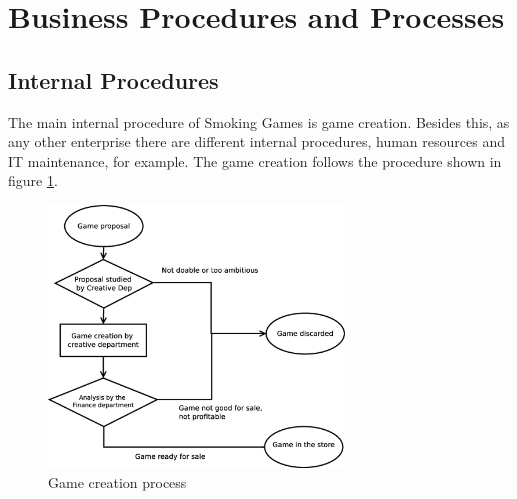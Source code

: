 \section{Business Procedures and Processes}




\subsection{Internal Procedures}
The main internal procedure of Smoking Games is game creation. Besides this, as any other enterprise there are different internal procedures, human resources and IT maintenance, for example. The game creation follows the procedure shown in figure \ref{fig:proc_game_creation}.

\begin{figure}[h] \centering
\includegraphics[width={0.7\textwidth}]{pictures/game_creation_process.eps}
\caption{Game creation process}
\label{fig:proc_game_creation}
\end{figure}

